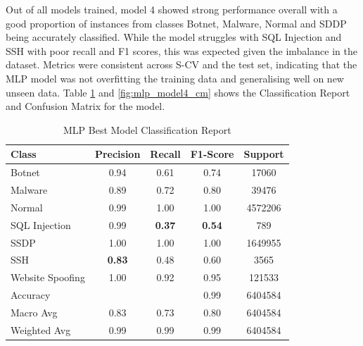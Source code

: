 Out of all models trained, model 4 showed strong performance overall with a good proportion of instances from classes Botnet, Malware, Normal and SDDP being accurately classified. While the model struggles with SQL Injection and SSH with poor recall and F1 scores, this was expected given the imbalance in the dataset. Metrics were consistent across S-CV and the test set, indicating that the MLP model was not overfitting the training data and generalising well on new unseen data. Table \ref{tab:mlp_class_report} and \ref{fig:mlp_model4_cm} shows the Classification Report and Confusion Matrix for the model. 

\begin{table}[htbp]
  \centering
  \caption{MLP Best Model Classification Report}
  \label{tab:mlp_class_report}
    \begin{tabular}{lcccc}
    \toprule
    Class & Precision & Recall & F1-Score & Support \\
    \midrule
    Botnet & 0.94 & 0.61 & 0.74 & 17060 \\
    Malware & 0.89 & 0.72 & 0.80 & 39476 \\
    Normal & 0.99 & 1.00 & 1.00 & 4572206 \\
    SQL Injection & 0.99 & {\color{red}\bfseries 0.37} & {\color{red}\bfseries 0.54} & 789 \\
    SSDP & 1.00 & 1.00 & 1.00 & 1649955 \\
    SSH & {\color{red}\bfseries 0.83} & 0.48 & 0.60 & 3565 \\
    Website Spoofing & 1.00 & 0.92 & 0.95 & 121533 \\
    \midrule
    Accuracy & & & 0.99 & 6404584 \\
    Macro Avg & 0.83 & 0.73 & 0.80 & 6404584 \\
    Weighted Avg & 0.99 & 0.99 & 0.99 & 6404584 \\
    \bottomrule
    \end{tabular}
\end{table}

